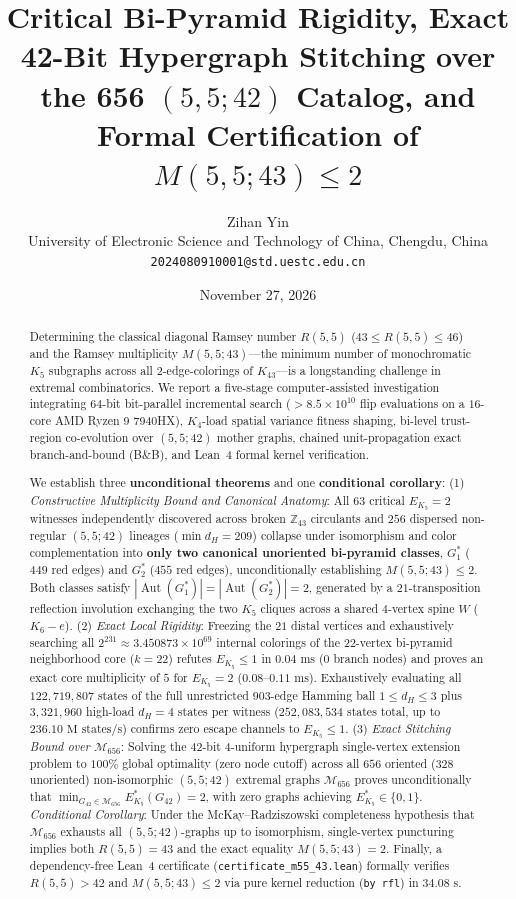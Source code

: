 \documentclass[11pt,a4paper]{article}
\title{\textbf{Critical Bi-Pyramid Rigidity, Exact 42-Bit Hypergraph Stitching over the 656 $(5,5;42)$ Catalog, and Formal Certification of $M(5,5;43) \le 2$}}
\author{
  Zihan Yin\\
  \small University of Electronic Science and Technology of China, Chengdu, China\\
  \small \texttt{2024080910001@std.uestc.edu.cn}
}
\date{November 27, 2026}
\theoremstyle{plain}
\theoremstyle{definition}
\DeclareMathOperator{\Aut}{Aut}
\begin{document}
\maketitle

\begin{abstract}
Determining the classical diagonal Ramsey number $R(5,5)$ ($43 \le R(5,5) \le 46$) and the Ramsey multiplicity $M(5,5;43)$---the minimum number of monochromatic $K_5$ subgraphs across all $2$-edge-colorings of $K_{43}$---is a longstanding challenge in extremal combinatorics. We report a five-stage computer-assisted investigation integrating $64$-bit bit-parallel incremental search ($>8.5 \times 10^{10}$ flip evaluations on a $16$-core AMD Ryzen 9 7940HX), $K_4$-load spatial variance fitness shaping, bi-level trust-region co-evolution over $(5,5;42)$ mother graphs, chained unit-propagation exact branch-and-bound (B\&B), and Lean~4 formal kernel verification.

We establish three \textbf{unconditional theorems} and one \textbf{conditional corollary}:
(1) \emph{Constructive Multiplicity Bound and Canonical Anatomy}: All $63$ critical $E_{K_5}=2$ witnesses independently discovered across broken $\mathbb{Z}_{43}$ circulants and $256$ dispersed non-regular $(5,5;42)$ lineages ($\min d_H = 209$) collapse under isomorphism and color complementation into \textbf{only two canonical unoriented bi-pyramid classes}, $G^*_1$ ($449$ red edges) and $G^*_2$ ($455$ red edges), unconditionally establishing $M(5,5;43) \le 2$. Both classes satisfy $|\Aut(G^*_1)| = |\Aut(G^*_2)| = 2$, generated by a $21$-transposition reflection involution exchanging the two $K_5$ cliques across a shared $4$-vertex spine $W$ ($K_6 - e$).
(2) \emph{Exact Local Rigidity}: Freezing the $21$ distal vertices and exhaustively searching all $2^{231} \approx 3.450873 \times 10^{69}$ internal colorings of the $22$-vertex bi-pyramid neighborhood core ($k=22$) refutes $E_{K_5} \le 1$ in $0.04\text{ ms}$ ($0$ branch nodes) and proves an exact core multiplicity of $5$ for $E_{K_5}=2$ ($0.08\text{--}0.11\text{ ms}$). Exhaustively evaluating all $122,719,807$ states of the full unrestricted $903$-edge Hamming ball $1 \le d_H \le 3$ plus $3,321,960$ high-load $d_H=4$ states per witness ($252,083,534$ states total, up to $236.10\text{ M states/s}$) confirms zero escape channels to $E_{K_5} \le 1$.
(3) \emph{Exact Stitching Bound over $\mathcal{M}_{656}$}: Solving the $42$-bit $4$-uniform hypergraph single-vertex extension problem to $100\%$ global optimality (zero node cutoff) across all $656$ oriented ($328$ unoriented) non-isomorphic $(5,5;42)$ extremal graphs $\mathcal{M}_{656}$ proves unconditionally that $\min_{G_{42} \in \mathcal{M}_{656}} E_{K_5}^*(G_{42}) = 2$, with zero graphs achieving $E_{K_5}^* \in \{0,1\}$.
\emph{Conditional Corollary}: Under the McKay--Radziszowski completeness hypothesis that $\mathcal{M}_{656}$ exhausts all $(5,5;42)$-graphs up to isomorphism, single-vertex puncturing implies both $R(5,5) = 43$ and the exact equality $M(5,5;43) = 2$. Finally, a dependency-free Lean~4 certificate (\texttt{certificate\_\allowbreak m55\_\allowbreak 43.lean}) formally verifies $R(5,5) > 42$ and $M(5,5;43) \le 2$ via pure kernel reduction (\texttt{by rfl}) in $34.08\text{ s}$.


\end{abstract}
\end{document}
